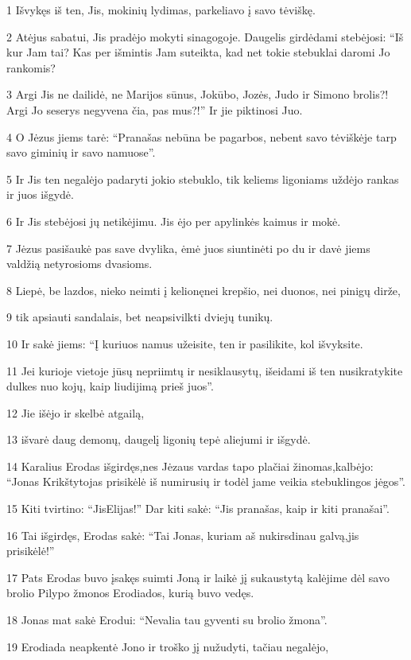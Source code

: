 \par 1 Išvykęs iš ten, Jis, mokinių lydimas, parkeliavo į savo tėviškę. 
\par 2 Atėjus sabatui, Jis pradėjo mokyti sinagogoje. Daugelis girdėdami stebėjosi: “Iš kur Jam tai? Kas per išmintis Jam suteikta, kad net tokie stebuklai daromi Jo rankomis? 
\par 3 Argi Jis ne dailidė, ne Marijos sūnus, Jokūbo, Jozės, Judo ir Simono brolis?! Argi Jo seserys negyvena čia, pas mus?!” Ir jie piktinosi Juo. 
\par 4 O Jėzus jiems tarė: “Pranašas nebūna be pagarbos, nebent savo tėviškėje tarp savo giminių ir savo namuose”. 
\par 5 Ir Jis ten negalėjo padaryti jokio stebuklo, tik keliems ligoniams uždėjo rankas ir juos išgydė. 
\par 6 Ir Jis stebėjosi jų netikėjimu. Jis ėjo per apylinkės kaimus ir mokė. 
\par 7 Jėzus pasišaukė pas save dvylika, ėmė juos siuntinėti po du ir davė jiems valdžią netyrosioms dvasioms. 
\par 8 Liepė, be lazdos, nieko neimti į kelionę­nei krepšio, nei duonos, nei pinigų dirže,­ 
\par 9 tik apsiauti sandalais, bet neapsivilkti dviejų tunikų. 
\par 10 Ir sakė jiems: “Į kuriuos namus užeisite, ten ir pasilikite, kol išvyksite. 
\par 11 Jei kurioje vietoje jūsų nepriimtų ir nesiklausytų, išeidami iš ten nusikratykite dulkes nuo kojų, kaip liudijimą prieš juos”. 
\par 12 Jie išėjo ir skelbė atgailą, 
\par 13 išvarė daug demonų, daugelį ligonių tepė aliejumi ir išgydė. 
\par 14 Karalius Erodas išgirdęs,­nes Jėzaus vardas tapo plačiai žinomas,­kalbėjo: “Jonas Krikštytojas prisikėlė iš numirusių ir todėl jame veikia stebuklingos jėgos”. 
\par 15 Kiti tvirtino: “Jis­Elijas!” Dar kiti sakė: “Jis pranašas, kaip ir kiti pranašai”. 
\par 16 Tai išgirdęs, Erodas sakė: “Tai Jonas, kuriam aš nukirsdinau galvą,­jis prisikėlė!” 
\par 17 Pats Erodas buvo įsakęs suimti Joną ir laikė jį sukaustytą kalėjime dėl savo brolio Pilypo žmonos Erodiados, kurią buvo vedęs. 
\par 18 Jonas mat sakė Erodui: “Nevalia tau gyventi su brolio žmona”. 
\par 19 Erodiada neapkentė Jono ir troško jį nužudyti, tačiau negalėjo, 
